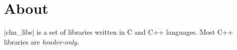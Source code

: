 \section{About}

\cverb|clm_libs| is a set of libraries written in C and C++ languages. Most C++ libraries are \emph{header-only}.
